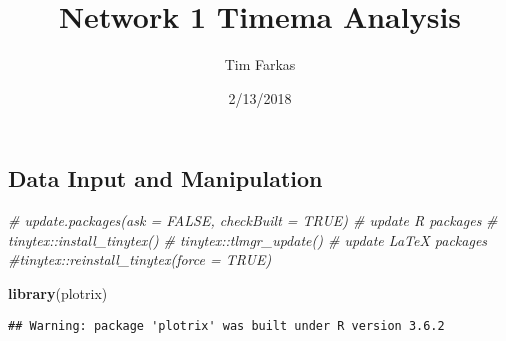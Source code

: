 \documentclass[]{article}
\title{Network 1 Timema Analysis}
\author{Tim Farkas}
\date{2/13/2018}
\newenvironment{Shaded}{\begin{snugshade}}{\end{snugshade}}
\newcommand{\KeywordTok}[1]{\textcolor[rgb]{0.13,0.29,0.53}{\textbf{#1}}}
\newcommand{\CommentTok}[1]{\textcolor[rgb]{0.56,0.35,0.01}{\textit{#1}}}
\newcommand{\NormalTok}[1]{#1}
\begin{document}
\maketitle

\subsection{Data Input and
Manipulation}\label{data-input-and-manipulation}

\begin{Shaded}
\begin{Highlighting}[]
\CommentTok{# update.packages(ask = FALSE, checkBuilt = TRUE)  # update R packages}
\CommentTok{# tinytex::install_tinytex()}
\CommentTok{# tinytex::tlmgr_update()  # update LaTeX packages}
\CommentTok{#tinytex::reinstall_tinytex(force = TRUE)}

\KeywordTok{library}\NormalTok{(plotrix)}
\end{Highlighting}
\end{Shaded}

\begin{verbatim}
## Warning: package 'plotrix' was built under R version 3.6.2
\end{verbatim}
\end{document}

